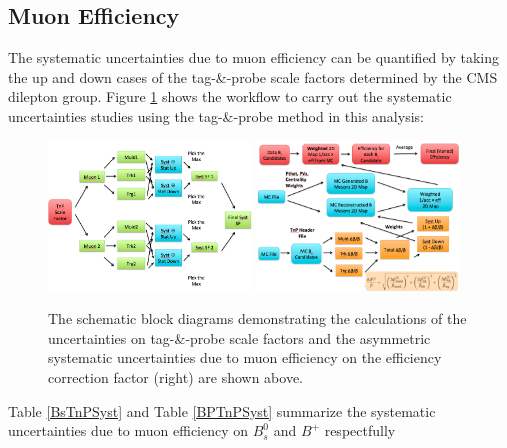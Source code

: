 \subsection{Muon Efficiency}

The systematic uncertainties due to muon efficiency can be quantified by taking the up and down cases of the tag-\&-probe scale factors determined by the CMS dilepton group. Figure \ref{MuonEffSystWF} shows the workflow to carry out the systematic uncertainties studies using the tag-\&-probe method in this analysis:

\begin{figure}[h]
\begin{center}
\includegraphics[width=0.48\textwidth]{Figures/Chapter5/TnPSystScheme.png}
\includegraphics[width=0.48\textwidth]{Figures/Chapter5/TnPSystCal.png}
\caption{The schematic block diagrams demonstrating the calculations of the uncertainties on tag-\&-probe scale factors and the asymmetric systematic uncertainties due to muon efficiency on the efficiency correction factor (right) are shown above.} 
\label{MuonEffSystWF} 
\end{center}
\end{figure}

Table \ref{BsTnPSyst} and Table \ref{BPTnPSyst} summarize the systematic uncertainties due to muon efficiency on $B^0_s$ and $B^+$ respectfully

